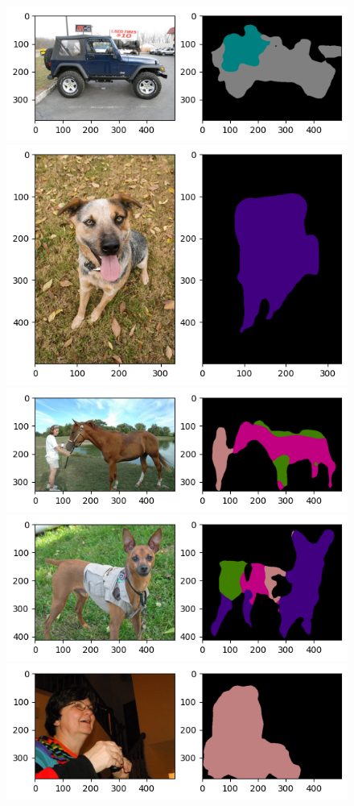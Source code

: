 \documentclass[extendedabs]{bmvc2k}
\begin{document}
\begin{figure}[t]
\centering
	\includegraphics[width=0.7\linewidth]{images/result/result6.png}
    \includegraphics[width=0.7\linewidth]{images/result/result7.png}
    \includegraphics[width=0.7\linewidth]{images/result/result8.png}
    \includegraphics[width=0.7\linewidth]{images/result/result9.png}
    \includegraphics[width=0.7\linewidth]{images/result/result10.png}

\end{figure}
\end{document}

